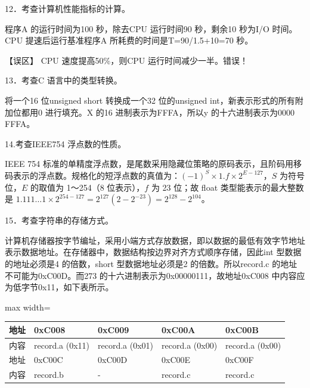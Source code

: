 \documentclass[UTF8,11pt]{ctexart}
\begin{document}
12．考查计算机性能指标的计算。


程序A 的运行时间为100 秒，除去CPU 运行时间90 秒，剩余10 秒为I/O 时间。CPU 提速后运行基准程序A 所耗费的时间是T=90/1.5+10=70 秒。


【误区】 CPU 速度提高50\%，则CPU 运行时间减少一半。错误！


13．考查C 语言中的类型转换。


将一个16 位unsigned short 转换成一个32 位的unsigned int，新表示形式的所有附加位都用0 进行填充。X 的16 进制表示为FFFA，所以y 的十六进制表示为0000 FFFA。


14.考查IEEE754 浮点数的性质。


IEEE 754 标准的单精度浮点数，是尾数采用隐藏位策略的原码表示，且阶码用移码表示的浮点数。规格化的短浮点数的真值为：\(\displaystyle (-1)^S\times1.f\times2^{E-127}\)，\(\displaystyle S\) 为符号位，\(\displaystyle E\) 的取值为 1～254（8 位表示），\(\displaystyle f\) 为 23 位；故 float 类型能表示的最大整数是 \(\displaystyle 1.111\ldots1\times2^{254-127}=2^{127}(2-2^{-23})=2^{128}-2^{104}\)。


15．考查字符串的存储方式。


计算机存储器按字节编址，采用小端方式存放数据，即以数据的最低有效字节地址表示数据地址。在存储器中，数据结构按边界对齐方式顺序存储，因此int 型数据的地址必须是4 的倍数，short 型数据地址必须是2 的倍数。所以record.c 的地址不可能为0xC00D。而273 的十六进制表示为0x00000111，故地址0xC008 中内容应为低字节0x11，如下表所示。


\begin{center}\begin{adjustbox}{max width=\linewidth}\begin{tabular}{|>{\raggedright\arraybackslash}p{\dimexpr(\linewidth-10\tabcolsep-6\arrayrulewidth)/5\relax}|>{\raggedright\arraybackslash}p{\dimexpr(\linewidth-10\tabcolsep-6\arrayrulewidth)/5\relax}|>{\raggedright\arraybackslash}p{\dimexpr(\linewidth-10\tabcolsep-6\arrayrulewidth)/5\relax}|>{\raggedright\arraybackslash}p{\dimexpr(\linewidth-10\tabcolsep-6\arrayrulewidth)/5\relax}|>{\raggedright\arraybackslash}p{\dimexpr(\linewidth-10\tabcolsep-6\arrayrulewidth)/5\relax}|}\hline
地址 & 0xC008 & 0xC009 & 0xC00A & 0xC00B\\\hline
内容 & record.a (0x11) & record.a (0x01) & record.a (0x00) & record.a (0x00)\\\hline
地址 & 0xC00C & 0xC00D & 0xC00E & 0xC00F\\\hline
内容 & record.b & - & record.c & record.c\\\hline\end{tabular}\end{adjustbox}\end{center}
\end{document}

